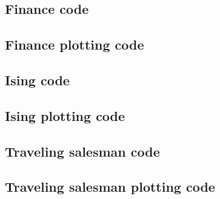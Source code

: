 \documentclass[twocolumn]{myarticle}
\begin{document}

\vspace{10pt}

\subsection{Finance code}
\label{subsec:finance_code}


\vspace{10pt}

\subsection{Finance plotting code}
\label{subsec:finance_plotting_code}


\vspace{10pt}

\subsection{Ising code}
\label{subsec:ising_code}


\vspace{10pt}

\subsection{Ising plotting code}
\label{subsec:ising_plotting_code}


\vspace{10pt}

\subsection{Traveling salesman code}
\label{subsec:traveling_salesman_code}



\subsection{Traveling salesman plotting code}
\label{subsec:traveling_salesman_plotting_code}


\end{document}
